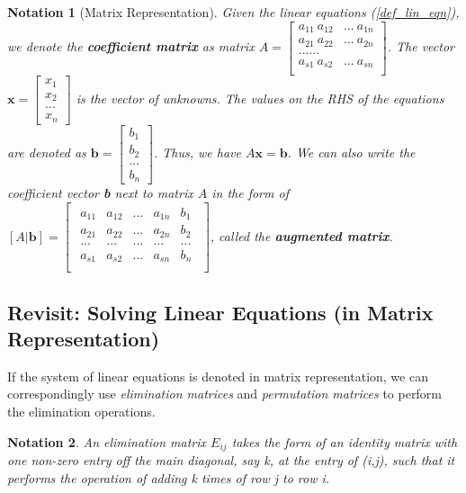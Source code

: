 \documentclass{article}
\newtheorem{notation}{Notation}[section] %
\begin{document}
\begin{notation}[Matrix Representation]
    Given the linear equations (\ref{def_lin_eqn}), we denote the \textbf{coefficient matrix} as matrix
    $A = \begin{bmatrix}
        a_{11} \ a_{12} & ... \ a_{1n} \\
        a_{21} \ a_{22} & ... \ a_{2n} \\
        ...... \\
        a_{s1} \ a_{s2} & ... \ a_{sn} \\
    \end{bmatrix}$. The vector $\textbf{x}=\begin{bmatrix}x_1 \\ x_2 \\ ... \\ x_n \end{bmatrix}$ is the vector of unknowns. The values on the RHS of the equations are denoted as $\textbf{b}=\begin{bmatrix}b_1 \\ b_2 \\ ... \\ b_n \end{bmatrix}$. Thus, we have $A\textbf{x}=\textbf{b}$.
    We can also write the coefficient vector \textbf{b} next to matrix $A$ in the form of $[A | \textbf{b}]=\begin{bmatrix}
    \begin{array}{cccc|c}
        a_{11} & a_{12} & ... & a_{1n} & b_1 \\
        a_{21} & a_{22} & ... & a_{2n} & b_2 \\
        ... & ... & ... & ... & ... \\
        a_{s1} & a_{s2} & ... & a_{sn} & b_n \\
    \end{array}
    \end{bmatrix}$, called the \textbf{augmented matrix}.
\end{notation}


\subsection{Revisit: Solving Linear Equations (in Matrix Representation)}
If the system of linear equations is denoted in matrix representation, we can correspondingly use \textit{elimination matrices} and \textit{permutation matrices} to perform the elimination operations.

\begin{notation}
    An elimination matrix \textit{$E_{ij}$} takes the form of an identity matrix with one non-zero entry off the main diagonal, say \textit{k}, at the entry of \textit{(i,j)}, such that it performs the operation of adding \textit{k} times of row \textit{j} to row \textit{i}.
\end{notation}
\end{document}
